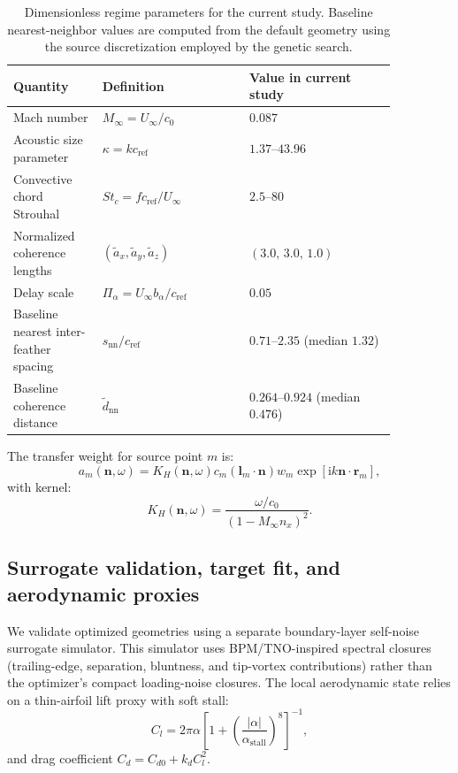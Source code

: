 \documentclass[11pt]{article}
\newcommand{\ii}{\mathrm{i}}
\newcommand{\vect}[1]{\bm{#1}}
\begin{document}
\begin{table}[htbp]
\centering
\caption{Dimensionless regime parameters for the current study. Baseline nearest-neighbor values are computed from the default geometry using the source discretization employed by the genetic search.}
\label{tab:nondim_regime}
\begin{tabular}{L{0.20\linewidth}L{0.33\linewidth}L{0.33\linewidth}}
\toprule
\textbf{Quantity} & \textbf{Definition} & \textbf{Value in current study} \\
\midrule
Mach number & $M_\infty = U_\infty/c_0$ & $0.087$ \\
Acoustic size parameter & $\kappa = kc_{\mathrm{ref}}$ & $1.37$--$43.96$ \\
Convective chord Strouhal & $St_c = fc_{\mathrm{ref}}/U_\infty$ & $2.5$--$80$ \\
Normalized coherence lengths & $(\tilde a_x,\tilde a_y,\tilde a_z)$ & $(3.0,\,3.0,\,1.0)$ \\
Delay scale & $\Pi_\alpha = U_\infty b_\alpha/c_{\mathrm{ref}}$ & $0.05$ \\
Baseline nearest inter-feather spacing & $s_{\mathrm{nn}}/c_{\mathrm{ref}}$ & $0.71$--$2.35$ (median $1.32$) \\
Baseline coherence distance & $\tilde d_{\mathrm{nn}}$ & $0.264$--$0.924$ (median $0.476$) \\
\bottomrule
\end{tabular}
\end{table}

The transfer weight for source point $m$ is:
\begin{equation}
    a_m(\vect{n},\omega)
    =
    K_H(\vect{n},\omega)
    c_m
    \left(
        \vect{l}_m\cdot\vect{n}
    \right)
    w_m
    \exp\left[
        \ii k\vect{n}\cdot\vect{r}_m
    \right],
\label{eq:transfer_weight}
\end{equation}
with kernel:
\begin{equation}
    K_H(\vect{n},\omega)
    =
    \frac{\omega/c_0}{(1-M_\infty n_x)^2}.
\end{equation}

\subsection{Surrogate validation, target fit, and aerodynamic proxies}

We validate optimized geometries using a separate boundary-layer self-noise surrogate simulator. This simulator uses BPM/TNO-inspired spectral closures (trailing-edge, separation, bluntness, and tip-vortex contributions) rather than the optimizer's compact loading-noise closures. The local aerodynamic state relies on a thin-airfoil lift proxy with soft stall:
\begin{equation}
    C_l =
    2\pi\alpha
    \left[
        1+
        \left(
            \frac{|\alpha|}{\alpha_{\mathrm{stall}}}
        \right)^8
    \right]^{-1},
\label{eq:lift_proxy}
\end{equation}
and drag coefficient $C_d = C_{d0}+k_dC_l^2$.
\end{document}
